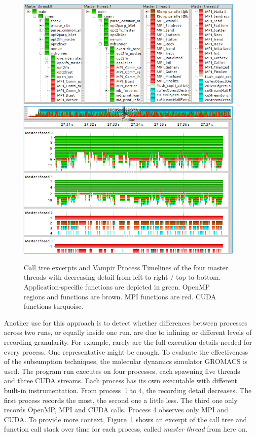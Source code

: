\documentclass[a4paper, final, diplominf]{zih-template}
\begin{document}
\begin{figure}[p]
	\centering
	\includegraphics[width=13.08cm]{gromacs-call-tree}
	\vspace{2cm} \\
	\includegraphics[width=13.08cm]{gromacs-process-timeline}
	\caption{Call tree excerpts and Vampir Process Timelines of the four master threads with decreasing detail from left to right / top to bottom. Application-specific functions are depicted in green. OpenMP regions and functions are brown. MPI functions are red. CUDA functions turquoise.}
	\label{fig:gromacs-call-tree-and-process-timeline}
\end{figure}
Another use for this approach is to detect whether differences between processes across two runs, or equally inside one run, are due to inlining or different levels of recording granularity.
For example, rarely are the full execution details needed for every process.
One representative might be enough.
To evaluate the effectiveness of the subsumption techniques, the molecular dynamics simulator GROMACS is used.
The program run executes on four processes, each spawning five threads and three CUDA streams.
Each process has its own executable with different built-in instrumentation.
From process~1 to 4, the recording detail decreases.
The first process records the most, the second one a little less.
The third one only records OpenMP, MPI and CUDA calls.
Process 4 observes only MPI and CUDA.
To provide more context, Figure~\ref{fig:gromacs-call-tree-and-process-timeline} shows an excerpt of the call tree and function call stack over time for each process, called \emph{master thread} from here on.
\end{document}
